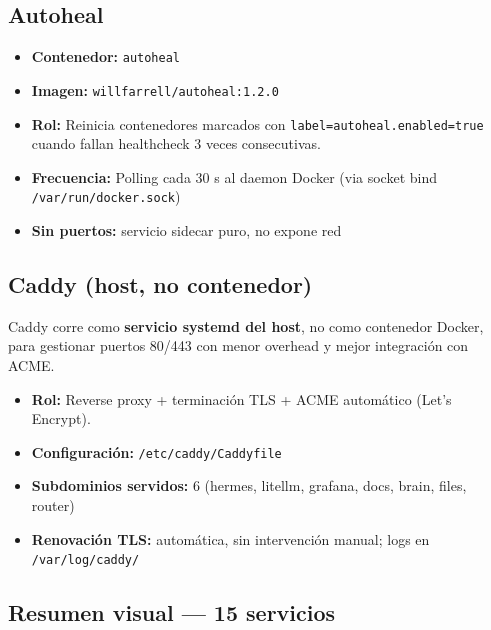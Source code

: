 \documentclass[11pt,a4paper]{article}
\newcommand{\dato}[2]{\textbf{\color{hermesblue}#1:} #2}
\begin{document}
\subsection{Autoheal}

\begin{itemize}[leftmargin=*,itemsep=1pt]
\item \dato{Contenedor}{\texttt{autoheal}}
\item \dato{Imagen}{\texttt{willfarrell/autoheal:1.2.0}}
\item \dato{Rol}{Reinicia contenedores marcados con \texttt{label=autoheal.enabled=true} cuando fallan healthcheck 3 veces consecutivas.}
\item \dato{Frecuencia}{Polling cada 30 s al daemon Docker (via socket bind \texttt{/var/run/docker.sock})}
\item \dato{Sin puertos}{servicio sidecar puro, no expone red}
\end{itemize}

\subsection{Caddy (host, no contenedor)}

Caddy corre como \textbf{servicio systemd del host}, no como contenedor Docker, para gestionar puertos 80/443 con menor overhead y mejor integración con ACME.

\begin{itemize}[leftmargin=*,itemsep=1pt]
\item \dato{Rol}{Reverse proxy + terminación TLS + ACME automático (Let's Encrypt).}
\item \dato{Configuración}{\texttt{/etc/caddy/Caddyfile}}
\item \dato{Subdominios servidos}{6 (hermes, litellm, grafana, docs, brain, files, router)}
\item \dato{Renovación TLS}{automática, sin intervención manual; logs en \texttt{/var/log/caddy/}}
\end{itemize}

\subsection{Resumen visual — 15 servicios}
\end{document}
